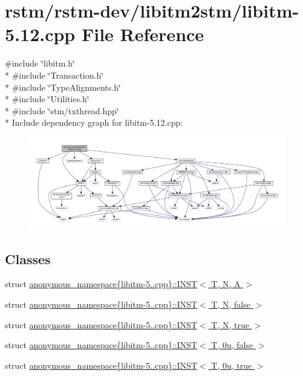 \hypertarget{libitm-5_812_8cpp}{\section{rstm/rstm-\/dev/libitm2stm/libitm-\/5.12.cpp File Reference}
\label{libitm-5_812_8cpp}
}
{\ttfamily \#include \char`\"{}libitm.\-h\char`\"{}}\\*
{\ttfamily \#include \char`\"{}Transaction.\-h\char`\"{}}\\*
{\ttfamily \#include \char`\"{}Type\-Alignments.\-h\char`\"{}}\\*
{\ttfamily \#include \char`\"{}Utilities.\-h\char`\"{}}\\*
{\ttfamily \#include \char`\"{}stm/txthread.\-hpp\char`\"{}}\\*
Include dependency graph for libitm-\/5.12.cpp\-:
\nopagebreak
\begin{figure}[H]
\begin{center}
\leavevmode
\includegraphics[width=350pt]{libitm-5_812_8cpp__incl}
\end{center}
\end{figure}
\subsection*{Classes}
\begin{DoxyCompactItemize}
\item 
struct \hyperlink{structanonymous__namespace_02libitm-5_812_8cpp_03_1_1INST}{anonymous\-\_\-namespace\{libitm-\/5..\-cpp\}\-::\-I\-N\-S\-T$<$ T, N, A $>$}
\item 
struct \hyperlink{structanonymous__namespace_02libitm-5_812_8cpp_03_1_1INST_3_01T_00_01N_00_01false_01_4}{anonymous\-\_\-namespace\{libitm-\/5..\-cpp\}\-::\-I\-N\-S\-T$<$ T, N, false $>$}
\item 
struct \hyperlink{structanonymous__namespace_02libitm-5_812_8cpp_03_1_1INST_3_01T_00_01N_00_01true_01_4}{anonymous\-\_\-namespace\{libitm-\/5..\-cpp\}\-::\-I\-N\-S\-T$<$ T, N, true $>$}
\item 
struct \hyperlink{structanonymous__namespace_02libitm-5_812_8cpp_03_1_1INST_3_01T_00_010u_00_01false_01_4}{anonymous\-\_\-namespace\{libitm-\/5..\-cpp\}\-::\-I\-N\-S\-T$<$ T, 0u, false $>$}
\item 
struct \hyperlink{structanonymous__namespace_02libitm-5_812_8cpp_03_1_1INST_3_01T_00_010u_00_01true_01_4}{anonymous\-\_\-namespace\{libitm-\/5..\-cpp\}\-::\-I\-N\-S\-T$<$ T, 0u, true $>$}
\end{DoxyCompactItemize}
